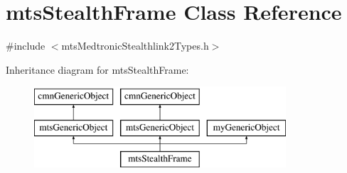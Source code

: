 \hypertarget{classmts_stealth_frame}{}\section{mts\+Stealth\+Frame Class Reference}
\label{classmts_stealth_frame}


{\ttfamily \#include $<$mts\+Medtronic\+Stealthlink2\+Types.\+h$>$}

Inheritance diagram for mts\+Stealth\+Frame\+:\begin{figure}[H]
\begin{center}
\leavevmode
\includegraphics[height=3.000000cm]{da/dc7/classmts_stealth_frame}
\end{center}
\end{figure}
